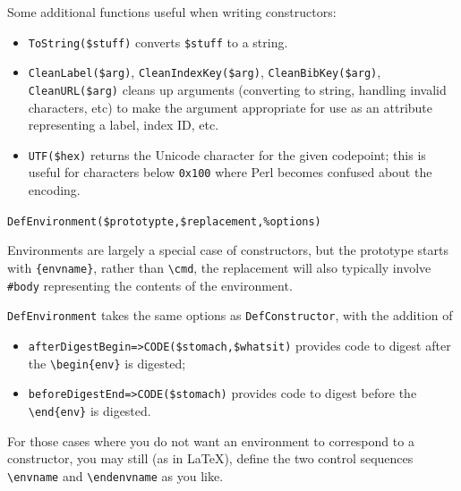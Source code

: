 \documentclass{book}
\newcommand{\ltxcode}{\lstinline[style=latexml]}
\begin{document}
Some additional functions useful when writing constructors:
\begin{itemize}
\item \ltxcode|ToString($stuff)| converts \ltxcode|$stuff| to a string.
\item \ltxcode|CleanLabel($arg)|,
   \ltxcode|CleanIndexKey($arg)|,
   \ltxcode|CleanBibKey($arg)|,
   \ltxcode|CleanURL($arg)|
  cleans up arguments (converting to string, handling invalid characters, etc)
  to make the argument appropriate for use as an attribute representing
  a label, index ID, etc.
\item \ltxcode|UTF($hex)| returns the Unicode character for the given
codepoint; this is useful for characters below \texttt{0x100} where
Perl becomes confused about the encoding.
\end{itemize}

\par\noindent \ltxcode|DefEnvironment($prototypte,$replacement,%
\par Environments are largely a special case of constructors,
but the prototype starts with \verb|{envname}|, rather than \verb|\cmd|,
the replacement will also typically involve \verb|#body| representing
the contents of the environment.

\texttt{DefEnvironment} takes the same options as  \texttt{DefConstructor},
with the addition of
\begin{itemize}
\item \ltxcode|afterDigestBegin=>CODE($stomach,$whatsit)|
provides code to digest after the \verb|\begin{env}| is digested;
\item \ltxcode|beforeDigestEnd=>CODE($stomach)|
provides code to digest before the \verb|\end{env}| is digested.
\end{itemize}

For those cases where you do not want an environment to correspond
to a constructor, you may still (as in \LaTeX), define the
two control sequences \verb|\envname| and \verb|\endenvname|
as you like.
\end{document}
